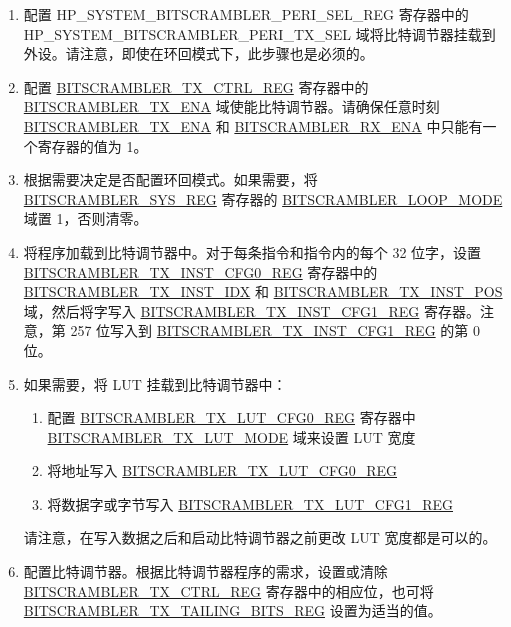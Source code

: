 \documentclass[main\_\_CN.tex]{subfiles}
\begin{document}
\begin{enumerate}
    \item 配置 HP\_SYSTEM\_BITSCRAMBLER\_PERI\_SEL\_REG 寄存器中的 HP\_SYSTEM\_BITSCRAMBLER\_PERI\_TX\_SEL 域将比特调节器挂载到外设。请注意，即使在环回模式下，此步骤也是必须的。
    \item 配置 \hyperref[regdesc:BITSCRAMBLERTXCTRLREG]{BITSCRAMBLER\_TX\_CTRL\_REG} 寄存器中的 \hyperref[fielddesc:BITSCRAMBLERTXENA]{BITSCRAMBLER\_TX\_ENA} 域使能比特调节器。请确保任意时刻 \hyperref[fielddesc:BITSCRAMBLERTXENA]{BITSCRAMBLER\_TX\_ENA} 和 \hyperref[fielddesc:BITSCRAMBLERRXENA]{BITSCRAMBLER\_RX\_ENA} 中只能有一个寄存器的值为 1。
    \item 根据需要决定是否配置环回模式。如果需要，将 \hyperref[regdesc:BITSCRAMBLERSYSREG]{BITSCRAMBLER\_SYS\_REG} 寄存器的 \hyperref[fielddesc:BITSCRAMBLERLOOPMODE] {BITSCRAMBLER\_LOOP\_MODE} 域置 1，否则清零。
    \item 将程序加载到比特调节器中。对于每条指令和指令内的每个 32 位字，设置 \hyperref[regdesc:BITSCRAMBLERTXINSTCFG0REG]{BITSCRAMBLER\_TX\_INST\_CFG0\_REG} 寄存器中的 \hyperref[fielddesc:BITSCRAMBLERTXINSTIDX]{BITSCRAMBLER\_TX\_INST\_IDX} 和 \hyperref[fielddesc:BITSCRAMBLERTXINSTPOS]{BITSCRAMBLER\_TX\_INST\_POS} 域，然后将字写入 \hyperref[regdesc:BITSCRAMBLERTXINSTCFG1REG]{BITSCRAMBLER\_TX\_INST\_CFG1\_REG} 寄存器。注意，第 257 位写入到 \hyperref[regdesc:BITSCRAMBLERTXINSTCFG1REG]{BITSCRAMBLER\_TX\_INST\_CFG1\_REG} 的第 0 位。
    \item 如果需要，将 LUT 挂载到比特调节器中：
    \begin{enumerate}
        \item 配置 \hyperref[regdesc:BITSCRAMBLERTXLUTCFG0REG]{BITSCRAMBLER\_TX\_LUT\_CFG0\_REG} 寄存器中 \hyperref[fielddesc:BITSCRAMBLERTXLUTMODE] {BITSCRAMBLER\_TX\_LUT\_MODE} 域来设置 LUT 宽度
        \item 将地址写入 \hyperref[regdesc:BITSCRAMBLERTXLUTCFG0REG]{BITSCRAMBLER\_TX\_LUT\_CFG0\_REG}
        \item 将数据字或字节写入 \hyperref[regdesc:BITSCRAMBLERTXLUTCFG1REG]{BITSCRAMBLER\_TX\_LUT\_CFG1\_REG}
    \end{enumerate}
        请注意，在写入数据之后和启动比特调节器之前更改 LUT 宽度都是可以的。
    \item 配置比特调节器。根据比特调节器程序的需求，设置或清除 \hyperref[regdesc:BITSCRAMBLERTXCTRLREG]{BITSCRAMBLER\_TX\_CTRL\_REG} 寄存器中的相应位，也可将 \hyperref[regdesc:BITSCRAMBLERTXTAILINGBITSREG]{BITSCRAMBLER\_TX\_TAILING\_BITS\_REG} 设置为适当的值。

\end{enumerate}
\end{document}
